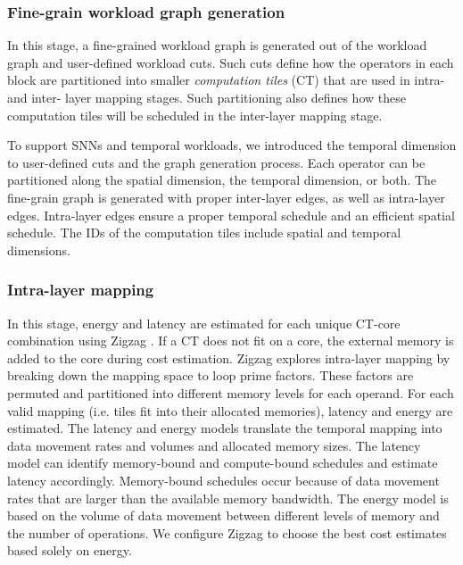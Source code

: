 \subsubsection{Fine-grain workload graph generation}

In this stage, a fine-grained workload graph is generated out of the workload graph and user-defined workload cuts. Such cuts define how the operators in each block are partitioned into smaller \textit{computation tiles} (CT) that are used in intra- and inter- layer mapping stages. Such partitioning also defines how these computation tiles will be scheduled in the inter-layer mapping stage. 

To support SNNs and temporal workloads, we introduced the temporal dimension to user-defined cuts and the graph generation process. Each operator can be partitioned along the spatial dimension, the temporal dimension, or both. The fine-grain graph is generated with proper inter-layer edges, as well as intra-layer edges. Intra-layer edges ensure a proper temporal schedule and an efficient spatial schedule. The IDs of the computation tiles include spatial and temporal dimensions.


\subsubsection{Intra-layer mapping}

In this stage, energy and latency are estimated for each unique CT-core combination using Zigzag \cite{zigzag}. If a CT does not fit on a core, the external memory is added to the core during cost estimation. Zigzag explores intra-layer mapping by breaking down the mapping space to loop prime factors. These factors are permuted and partitioned into different memory levels for each operand. For each valid mapping (i.e. tiles fit into their allocated memories), latency and energy are estimated. The latency and energy models translate the temporal mapping into data movement rates and volumes and allocated memory sizes. The latency model can identify memory-bound and compute-bound schedules and estimate latency accordingly. Memory-bound schedules occur because of data movement rates that are larger than the available memory bandwidth. The energy model is based on the volume of data movement between different levels of memory and the number of operations. We configure Zigzag to choose the best cost estimates based solely on energy.

